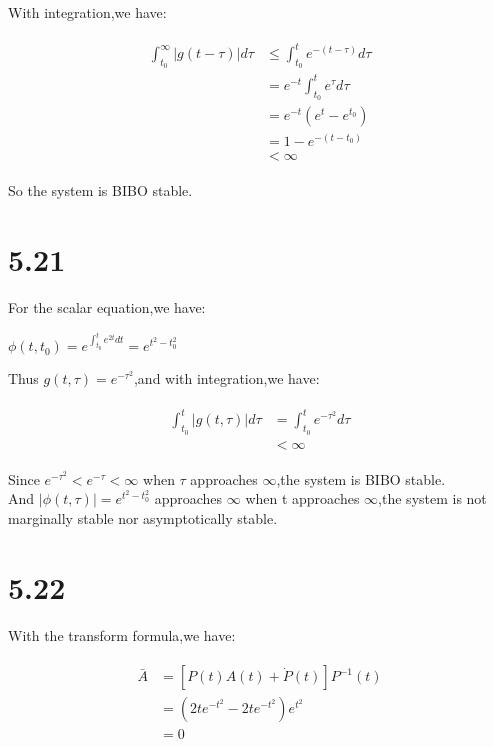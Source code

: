 \documentclass{article}
\begin{document}
With integration,we have:\\
\begin{center}
    \begin{eqnarray*}\begin{split}
    \int_{t_0}^{\infty} |g(t-\tau)| d\tau &\leq \int_{t_0}^{t} e^{-(t-\tau)} d\tau\\
    &=e^{-t}\int_{t_0}^t e^{\tau} d\tau\\
    &=e^{-t}(e^{t}-e^{t_0})\\
    &=1-e^{-(t-t_0)}\\
    &<\infty
    \end{split}\end{eqnarray*}
\end{center}

So the system is BIBO stable.\\

\section*{5.21}

For the scalar equation,we have:\\
\begin{center}
    $\phi (t,t_0)=e^{\int_{t_0}^t e^{2t} dt}=e^{t^2-t_0^2}$
\end{center}

Thus $g(t,\tau)=e^{-\tau^2}$,and with integration,we have:\\
\begin{center}
    \begin{eqnarray*}\begin{split}
    \int_{t_0}^t|g(t,\tau)| d\tau&=\int_{t_0}^t e^{-\tau^2} d\tau\\
    &<\infty
    \end{split}\end{eqnarray*}
\end{center}

Since $e^{-\tau^2}<e^{-\tau}<\infty$ when $\tau$ approaches $\infty$,the system is BIBO stable.\\

And $|\phi (t,\tau)|=e^{t^{2}-t_0^2}$ approaches $\infty$ when t approaches $\infty$,the system is not marginally stable nor asymptotically stable.\\

\section*{5.22}
With the transform formula,we have:\\
\begin{center}
    \begin{eqnarray*}\begin{split}
    \bar{A}&=[P(t)A(t)+\dot{P}(t)]P^{-1}(t)\\
    &=(2te^{-t^2}-2te^{-t^2})e^{t^2}\\
    &=0
    \end{split}\end{eqnarray*}
\end{center}
\end{document}
